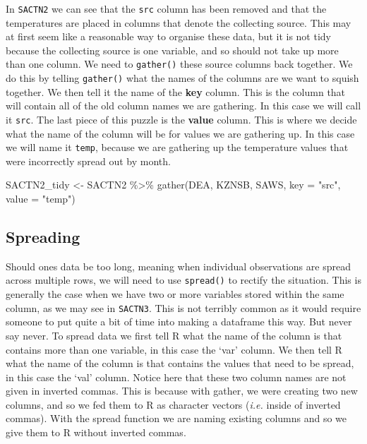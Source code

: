 \documentclass[
]{book}
\newenvironment{Shaded}{\begin{snugshade}}{\end{snugshade}}
\newcommand{\AttributeTok}[1]{\textcolor[rgb]{0.77,0.63,0.00}{#1}}
\newcommand{\FunctionTok}[1]{\textcolor[rgb]{0.00,0.00,0.00}{#1}}
\newcommand{\NormalTok}[1]{#1}
\newcommand{\OtherTok}[1]{\textcolor[rgb]{0.56,0.35,0.01}{#1}}
\newcommand{\SpecialCharTok}[1]{\textcolor[rgb]{0.00,0.00,0.00}{#1}}
\newcommand{\StringTok}[1]{\textcolor[rgb]{0.31,0.60,0.02}{#1}}
\begin{document}
In \texttt{SACTN2} we can see that the \texttt{src} column has been removed and that the temperatures are placed in columns that denote the collecting source. This may at first seem like a reasonable way to organise these data, but it is not tidy because the collecting source is one variable, and so should not take up more than one column. We need to \texttt{gather()} these source columns back together. We do this by telling \texttt{gather()} what the names of the columns are we want to squish together. We then tell it the name of the \textbf{key} column. This is the column that will contain all of the old column names we are gathering. In this case we will call it \texttt{src}. The last piece of this puzzle is the \textbf{value} column. This is where we decide what the name of the column will be for values we are gathering up. In this case we will name it \texttt{temp}, because we are gathering up the temperature values that were incorrectly spread out by month.

\begin{Shaded}
\begin{Highlighting}[]
\NormalTok{SACTN2\_tidy }\OtherTok{\textless{}{-}}\NormalTok{ SACTN2 }\SpecialCharTok{\%\textgreater{}\%}
  \FunctionTok{gather}\NormalTok{(DEA, KZNSB, SAWS, }\AttributeTok{key =} \StringTok{"src"}\NormalTok{, }\AttributeTok{value =} \StringTok{"temp"}\NormalTok{)}
\end{Highlighting}
\end{Shaded}

\hypertarget{spreading}{%
\subsection{Spreading}\label{spreading}}

Should ones data be too long, meaning when individual observations are spread across multiple rows, we will need to use \texttt{spread()} to rectify the situation. This is generally the case when we have two or more variables stored within the same column, as we may see in \texttt{SACTN3}. This is not terribly common as it would require someone to put quite a bit of time into making a dataframe this way. But never say never. To spread data we first tell R what the name of the column is that contains more than one variable, in this case the `var' column. We then tell R what the name of the column is that contains the values that need to be spread, in this case the `val' column. Notice here that these two column names are not given in inverted commas. This is because with gather, we were creating two new columns, and so we fed them to R as character vectors (\emph{i.e.} inside of inverted commas). With the spread function we are naming existing columns and so we give them to R without inverted commas.
\end{document}
